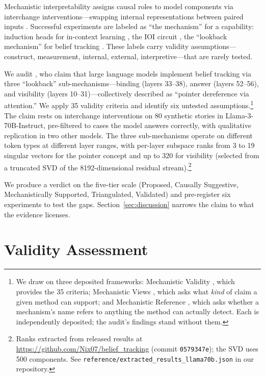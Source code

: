 \documentclass{article}
\begin{document}
Mechanistic interpretability assigns causal roles to model components via interchange interventions---swapping internal representations between paired inputs \citep{geiger2021causal, vig2020investigating}. Successful experiments are labeled as ``the mechanism'' for a capability: induction heads for in-context learning \citep{olsson2022context}, the IOI circuit \citep{wang2023interpretability}, the ``lookback mechanism'' for belief tracking \citep{prakash2025lookback}. These labels carry validity assumptions---construct, measurement, internal, external, interpretive---that are rarely tested.

We audit \citet{prakash2025lookback}, who claim that large language models implement belief tracking via three ``lookback'' sub-mechanisms---binding (layers 33--38), answer (layers 52--56), and visibility (layers 10--31)---collectively described as ``pointer dereference via attention.'' We apply 35 validity criteria and identify six untested assumptions.\footnote{We draw on three deposited frameworks: Mechanistic Validity \citep{tower2026mechval}, which provides the 35 criteria; Mechanistic Views \citep{tower2026mechviews}, which asks what \emph{kind} of claim a given method can support; and Mechanistic Reference \citep{tower2026mechref}, which asks whether a mechanism's name refers to anything the method can actually detect. Each is independently deposited; the audit's findings stand without them.} The claim rests on interchange interventions on 80 synthetic stories in Llama-3-70B-Instruct, pre-filtered to cases the model answers correctly, with qualitative replication in two other models. The three sub-mechanisms operate on different token types at different layer ranges, with per-layer subspace ranks from 3 to 19 singular vectors for the pointer concept and up to 320 for visibility (selected from a truncated SVD of the 8192-dimensional residual stream).\footnote{Ranks extracted from released results at \url{https://github.com/Nix07/belief_tracking} (commit \texttt{0579347e}); the SVD uses 500 components. See \texttt{reference/extracted\_results\_llama70b.json} in our repository.}

We produce a verdict on the five-tier scale (Proposed, Causally Suggestive, Mechanistically Supported, Triangulated, Validated) and pre-register six experiments to test the gaps. Section~\ref{sec:discussion} narrows the claim to what the evidence licenses.


\section{Validity Assessment}
\label{sec:validity}
\end{document}
